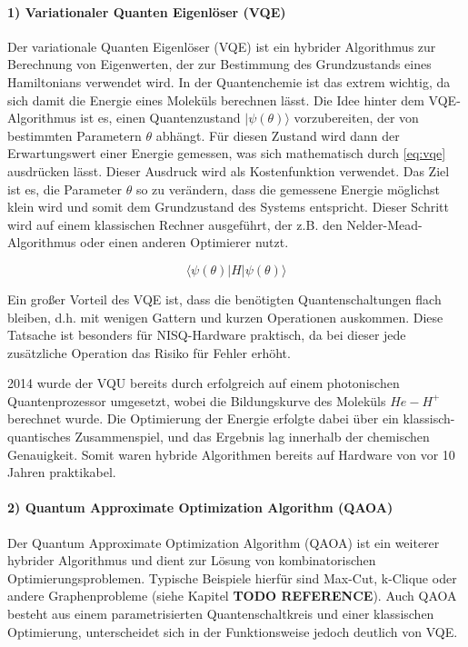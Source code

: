 \paragraph{1) Variationaler Quanten Eigenlöser (VQE)}
\label{nisq-definition}
Der variationale Quanten Eigenlöser (VQE) ist ein hybrider Algorithmus zur Berechnung von Eigenwerten, der zur Bestimmung des Grundzustands eines Hamiltonians verwendet wird. In der Quantenchemie ist das extrem wichtig, da sich damit die Energie eines Moleküls berechnen lässt. Die Idee hinter dem VQE-Algorithmus ist es, einen Quantenzustand $|\psi(\theta)\rangle$ vorzubereiten, der von bestimmten Parametern $\theta$ abhängt. Für diesen Zustand wird dann der Erwartungswert einer Energie gemessen, was sich mathematisch durch \autoref{eq:vqe} ausdrücken lässt. Dieser Ausdruck wird als Kostenfunktion verwendet. Das Ziel ist es, die Parameter $\theta$ so zu verändern, dass die gemessene Energie möglichst klein wird und somit dem Grundzustand des Systems entspricht. Dieser Schritt wird auf einem klassischen Rechner ausgeführt, der z.B. den Nelder-Mead-Algorithmus oder einen anderen Optimierer nutzt. 

\begin{equation}
    \langle\psi(\theta)|H|\psi(\theta)\rangle
\label{eq:vqe}
\end{equation}

Ein großer Vorteil des VQE ist, dass die benötigten Quantenschaltungen flach bleiben, d.h. mit wenigen Gattern und kurzen Operationen auskommen. Diese Tatsache ist besonders für NISQ-Hardware praktisch, da bei dieser jede zusätzliche Operation das Risiko für Fehler erhöht.

2014 wurde der VQU bereits durch \citeauthor{peruzzo_variational_nodate} erfolgreich auf einem photonischen Quantenprozessor umgesetzt, wobei die Bildungskurve des Moleküls $He-H^+$ berechnet wurde. Die Optimierung der Energie erfolgte dabei über ein klassisch-quantisches Zusammenspiel, und das Ergebnis lag innerhalb der chemischen Genauigkeit. Somit waren hybride Algorithmen bereits auf Hardware von vor 10 Jahren praktikabel. \autocite{cerezo_variational_2022} \autocite{peruzzo_variational_nodate}
\\

\paragraph{2) Quantum Approximate Optimization Algorithm (QAOA)}
Der Quantum Approximate Optimization Algorithm (QAOA) ist ein weiterer hybrider Algorithmus und dient zur Lösung von kombinatorischen Optimierungsproblemen. Typische Beispiele hierfür sind Max-Cut, k-Clique oder andere Graphenprobleme (siehe Kapitel \textbf{TODO REFERENCE}). Auch QAOA besteht aus einem parametrisierten Quantenschaltkreis und einer klassischen Optimierung, unterscheidet sich in der Funktionsweise jedoch deutlich von VQE.

